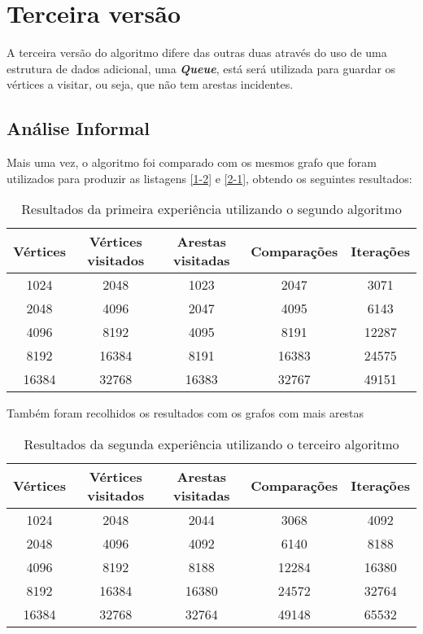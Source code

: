 \chapter{Terceira versão}

A terceira versão do algoritmo difere das outras duas através do uso de uma
estrutura de dados adicional, uma \textbf{\textit{Queue}}, está será utilizada
para guardar os vértices a visitar, ou seja, que não tem arestas incidentes.

\section{Análise Informal}

Mais uma vez, o algoritmo foi comparado com os mesmos grafo que foram utilizados
para produzir as listagens \ref{1-2} e \ref{2-1}, obtendo os seguintes resultados:

\begin{table}[H]
	\centering
	\begin{tabular}{| c || c | c | c | c |}
		\hline
		Vértices & Vértices visitados & Arestas visitadas & Comparações & Iterações \\
		\hline\hline
		1024     & 2048               & 1023              & 2047        & 3071      \\
		2048     & 4096               & 2047              & 4095        & 6143      \\
		4096     & 8192               & 4095              & 8191        & 12287     \\
		8192     & 16384              & 8191              & 16383       & 24575     \\
		16384    & 32768              & 16383             & 32767       & 49151     \\
		\hline
	\end{tabular}
	\caption{Resultados da primeira experiência utilizando o segundo algoritmo}
	\label{table:v3-one}
\end{table}

Também foram recolhidos os resultados com os grafos com mais arestas

\begin{table}[H]
	\centering
	\begin{tabular}{| c || c | c | c | c |}
		\hline
		Vértices & Vértices visitados & Arestas visitadas & Comparações & Iterações \\
		\hline\hline
		1024     & 2048               & 2044              & 3068        & 4092      \\
		2048     & 4096               & 4092              & 6140        & 8188      \\
		4096     & 8192               & 8188              & 12284       & 16380     \\
		8192     & 16384              & 16380             & 24572       & 32764     \\
		16384    & 32768              & 32764             & 49148       & 65532     \\
		\hline
	\end{tabular}
	\caption{Resultados da segunda experiência utilizando o terceiro algoritmo}
	\label{table:v3-two}
\end{table}

